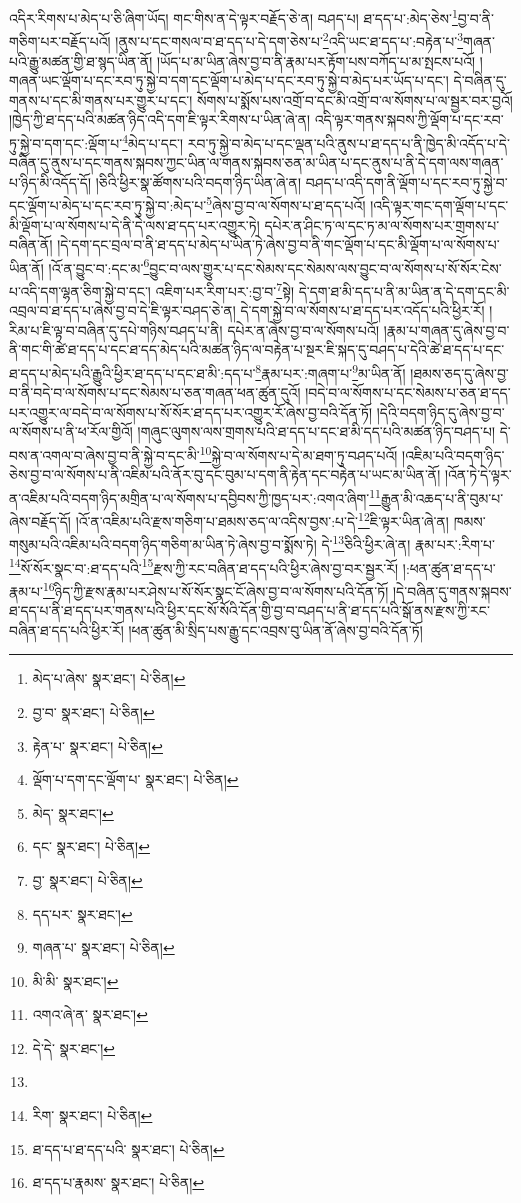 འདིར་རིགས་པ་མེད་པ་ཅི་ཞིག་ཡོད། གང་གིས་ན་དེ་ལྟར་བརྗོད་ཅེ་ན། བཤད་པ། ཐ་དད་པ་:མེད་ཅེས་\footnote{མེད་པ་ཞེས་  སྣར་ཐང་།  པེ་ཅིན། }བྱ་བ་ནི་གཅིག་པར་བརྗོད་པའོ། །ནུས་པ་དང་གསལ་བ་ཐ་དད་པ་དེ་དག་ཅེས་པ་\footnote{བྱ་བ་  སྣར་ཐང་།  པེ་ཅིན། }འདི་ཡང་ཐ་དད་པ་:བརྟེན་པ་\footnote{རྟེན་པ་  སྣར་ཐང་།  པེ་ཅིན། }གཞན་པའི་རྒྱུ་མཚན་གྱི་ཐ་སྙད་ཡིན་ནོ། །ཡོད་པ་མ་ཡིན་ཞེས་བྱ་བ་ནི་རྣམ་པར་རྟོག་པས་བཀོད་པ་མ་སྤངས་པའོ། །གཞན་ཡང་ལྡོག་པ་དང་རབ་ཏུ་སྐྱེ་བ་དག་དང་ལྡོག་པ་མེད་པ་དང་རབ་ཏུ་སྐྱེ་བ་མེད་པར་ཡོད་པ་དང་། དེ་བཞིན་དུ་གནས་པ་དང་མི་གནས་པར་གྱུར་པ་དང་། སོགས་པ་སྨོས་པས་འགྲོ་བ་དང་མི་འགྲོ་བ་ལ་སོགས་པ་ལ་སྦྱར་བར་བྱའོ། །ཁྱེད་ཀྱི་ཐ་དད་པའི་མཚན་ཉིད་འདི་དག་ཇི་ལྟར་རིགས་པ་ཡིན་ཞེ་ན། འདི་ལྟར་གནས་སྐབས་ཀྱི་ལྡོག་པ་དང་རབ་ཏུ་སྐྱེ་བ་དག་དང་:ལྡོག་པ་\footnote{ལྡོག་པ་དག་དང་ལྡོག་པ་  སྣར་ཐང་།  པེ་ཅིན། }མེད་པ་དང་། རབ་ཏུ་སྐྱེ་བ་མེད་པ་དང་ལྡན་པའི་ནུས་པ་ཐ་དད་པ་ནི་ཁྱེད་མི་འདོད་པ་དེ་བཞིན་དུ་ནུས་པ་དང་གནས་སྐབས་ཀྱང་ཡིན་ལ་གནས་སྐབས་ཅན་མ་ཡིན་པ་དང་ནུས་པ་ནི་དེ་དག་ལས་གཞན་པ་ཉིད་མི་འདོད་དོ། །ཅིའི་ཕྱིར་སྣ་ཚོགས་པའི་བདག་ཉིད་ཡིན་ཞེ་ན། བཤད་པ་འདི་དག་ནི་ལྡོག་པ་དང་རབ་ཏུ་སྐྱེ་བ་དང་ལྡོག་པ་མེད་པ་དང་རབ་ཏུ་སྐྱེ་བ་:མེད་པ་\footnote{མེད་  སྣར་ཐང་། }ཞེས་བྱ་བ་ལ་སོགས་པ་ཐ་དད་པའོ། །འདི་ལྟར་གང་དག་ལྡོག་པ་དང་མི་ལྡོག་པ་ལ་སོགས་པ་དེ་ནི་དེ་ལས་ཐ་དད་པར་འགྱུར་ཏེ། དཔེར་ན་ཤིང་ཏ་ལ་དང་ཏ་མ་ལ་སོགས་པར་གྲགས་པ་བཞིན་ནོ། །དེ་དག་དང་བྲལ་བ་ནི་ཐ་དད་པ་མེད་པ་ཡིན་ཏེ་ཞེས་བྱ་བ་ནི་གང་ལྡོག་པ་དང་མི་ལྡོག་པ་ལ་སོགས་པ་ཡིན་ནོ། །འོ་ན་བྱུང་བ་:དང་མ་\footnote{དང་  སྣར་ཐང་།  པེ་ཅིན། }བྱུང་བ་ལས་གྱུར་པ་དང་སེམས་དང་སེམས་ལས་བྱུང་བ་ལ་སོགས་པ་སོ་སོར་ངེས་པ་འདི་དག་ལྷན་ཅིག་སྐྱེ་བ་དང་། འཇིག་པར་རིག་པར་:བྱ་བ་\footnote{བྱ་  སྣར་ཐང་།  པེ་ཅིན། }སྟེ། དེ་དག་ཐ་མི་དད་པ་ནི་མ་ཡིན་ན་དེ་དག་དང་མི་འབྲལ་བ་ཐ་དད་པ་ཞེས་བྱ་བ་དེ་ཇི་ལྟར་བཤད་ཅེ་ན། དེ་དག་སྐྱེ་བ་ལ་སོགས་པ་ཐ་དད་པར་འདོད་པའི་ཕྱིར་རོ། །རིམ་པ་ཇི་ལྟ་བ་བཞིན་དུ་དཔེ་གཉིས་བཤད་པ་ནི། དཔེར་ན་ཞེས་བྱ་བ་ལ་སོགས་པའོ། །རྣམ་པ་གཞན་དུ་ཞེས་བྱ་བ་ནི་གང་གི་ཚེ་ཐ་དད་པ་དང་ཐ་དད་མེད་པའི་མཚན་ཉིད་ལ་བརྟེན་པ་སྔར་ཇི་སྐད་དུ་བཤད་པ་དེའི་ཚེ་ཐ་དད་པ་དང་ཐ་དད་པ་མེད་པའི་རྒྱུའི་ཕྱིར་ཐ་དད་པ་དང་ཐ་མི་:དད་པ་\footnote{དད་པར་  སྣར་ཐང་། }རྣམ་པར་:གཞག་པ་\footnote{གཞན་པ་  སྣར་ཐང་།  པེ་ཅིན། }མ་ཡིན་ནོ། །ཐམས་ཅད་དུ་ཞེས་བྱ་བ་ནི་བདེ་བ་ལ་སོགས་པ་དང་སེམས་པ་ཅན་གཞན་ཕན་ཚུན་དུའོ། །བདེ་བ་ལ་སོགས་པ་དང་སེམས་པ་ཅན་ཐ་དད་པར་འགྱུར་ལ་བདེ་བ་ལ་སོགས་པ་སོ་སོར་ཐ་དད་པར་འགྱུར་རོ་ཞེས་བྱ་བའི་དོན་ཏོ། །དེའི་བདག་ཉིད་དུ་ཞེས་བྱ་བ་ལ་སོགས་པ་ནི་ཕ་རོལ་གྱིའོ། །གཞུང་ལུགས་ལས་གྲགས་པའི་ཐ་དད་པ་དང་ཐ་མི་དད་པའི་མཚན་ཉིད་བཤད་པ། དེ་བས་ན་འགལ་བ་ཞེས་བྱ་བ་ནི་སྐྱེ་བ་དང་མི་\footnote{མི་མི་  སྣར་ཐང་། }སྐྱེ་བ་ལ་སོགས་པ་དེ་མ་ཐག་ཏུ་བཤད་པའོ། །འཇིམ་པའི་བདག་ཉིད་ཅེས་བྱ་བ་ལ་སོགས་པ་ནི་འཇིམ་པའི་ནོར་བུ་དང་བུམ་པ་དག་ནི་རྟེན་དང་བརྟེན་པ་ཡང་མ་ཡིན་ནོ། །འོན་ཏེ་དེ་ལྟར་ན་འཇིམ་པའི་བདག་ཉིད་མགྲིན་པ་ལ་སོགས་པ་དབྱིབས་ཀྱི་ཁྱད་པར་:འགའ་ཞིག་\footnote{འགའ་ཞེ་ན་  སྣར་ཐང་། }རྒྱུན་མི་འཆད་པ་ནི་བུམ་པ་ཞེས་བརྗོད་དོ། །འོ་ན་འཇིམ་པའི་རྫས་གཅིག་པ་ཐམས་ཅད་ལ་འདིས་བྱས་:པ་དེ་\footnote{དེ་དེ་  སྣར་ཐང་། }ཇི་ལྟར་ཡིན་ཞེ་ན། ཁམས་གསུམ་པའི་འཇིམ་པའི་བདག་ཉིད་གཅིག་མ་ཡིན་ཏེ་ཞེས་བྱ་བ་སྨོས་ཏེ། དེ་\footnote{}ཅིའི་ཕྱིར་ཞེ་ན། རྣམ་པར་:རིག་པ་\footnote{རིག་  སྣར་ཐང་།  པེ་ཅིན། }སོ་སོར་སྣང་བ་:ཐ་དད་པའི་\footnote{ཐ་དད་པ་ཐ་དད་པའི་  སྣར་ཐང་།  པེ་ཅིན། }རྫས་ཀྱི་རང་བཞིན་ཐ་དད་པའི་ཕྱིར་ཞེས་བྱ་བར་སྦྱར་རོ། །:ཕན་ཚུན་ཐ་དད་པ་རྣམ་པ་\footnote{ཐ་དད་པ་རྣམས་  སྣར་ཐང་།  པེ་ཅིན། }ཉིད་ཀྱི་རྫས་རྣམ་པར་ཤེས་པ་སོ་སོར་སྣང་ངོ་ཞེས་བྱ་བ་ལ་སོགས་པའི་དོན་ཏོ། །དེ་བཞིན་དུ་གནས་སྐབས་ཐ་དད་པ་ནི་ཐ་དད་པར་གནས་པའི་ཕྱིར་དང་སོ་སོའི་དོན་གྱི་བྱ་བ་བཤད་པ་ནི་ཐ་དད་པའི་སྒོ་ནས་རྫས་ཀྱི་རང་བཞིན་ཐ་དད་པའི་ཕྱིར་རོ། །ཕན་ཚུན་མི་སྲིད་པས་རྒྱུ་དང་འབྲས་བུ་ཡིན་ནོ་ཞེས་བྱ་བའི་དོན་ཏོ། 